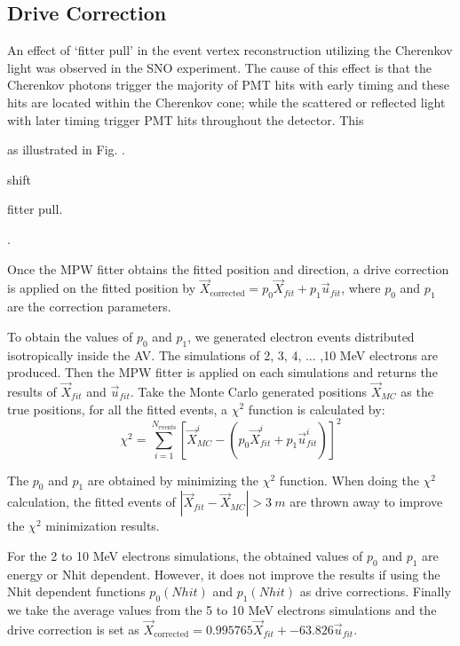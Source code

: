 \subsection{Drive Correction}

An effect of `fitter pull' in the event vertex reconstruction utilizing the Cherenkov light was observed in the SNO experiment. The cause of this effect is that the Cherenkov photons trigger the majority of PMT hits with early timing and these hits are located within the Cherenkov cone; while the scattered or reflected light with later timing trigger PMT hits throughout the detector. This 




 as illustrated in Fig. .

  
 

shift 

fitter pull.



\cite{brice1996monte,coulter2013modelling}.


Once the MPW fitter obtains the fitted position and direction, a drive correction is applied on the fitted position by $\vec{X}_{\mathrm{corrected}} = p_0\vec{X}_{fit}+p_1\vec{u}_{fit}$, where $p_0$ and $p_1$ are the correction parameters.


To obtain the values of $p_0$ and $p_1$, we generated electron events distributed isotropically inside the AV. The simulations of 2, 3, 4, ... ,10 MeV electrons are produced. Then the MPW fitter is applied on each simulations and returns the results of $\vec{X}_{fit}$ and $\vec{u}_{fit}$. Take the Monte Carlo generated positions $\vec{X}_{MC}$ as the true positions, for all the fitted events, a $\chi^2$ function is calculated by:
\[
\chi^2 = \sum_{i=1}^{N_{\mathrm{events}}}[\vec{X}^i_{MC}-(p_0\vec{X}^i_{fit}+p_1\vec{u}^i_{fit})]^2
\]

The $p_0$ and $p_1$ are obtained by minimizing the $\chi^2$ function. 
When doing the $\chi^2$ calculation, the fitted events of $|\vec{X}_{fit}-\vec{X}_{MC}|>3~m$ are thrown away to improve the $\chi^2$ minimization results.

For the 2 to 10 MeV electrons simulations, the obtained values of $p_0$ and $p_1$ are energy or Nhit dependent. However, it does not improve the results if using the Nhit dependent functions $p_0(Nhit)$ and $p_1(Nhit)$ as drive corrections.
Finally we take the average values from the 5 to 10 MeV electrons simulations and the drive correction is set as $\vec{X}_{\mathrm{corrected}} = 0.995765\vec{X}_{fit}+-63.826\vec{u}_{fit}$.

